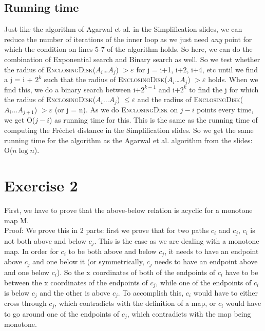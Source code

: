 \documentclass[a4paper,11pt]{article}
\begin{document}
\subsection*{Running time}
Just like the algorithm of Agarwal et al. in the Simplification slides, we can reduce the number of iterations of the inner loop as we just need \textit{any} point for which the condition on lines 5-7 of the algorithm holds. So here, we can do the combination of Exponential search and Binary search as well. So we test whether the radius of \textsc{EnclosingDisk($A_i$\dots $A_j$)} $> \varepsilon$ for j = i+1, i+2, i+4, etc until we find a j = i + $2^k$ such that the radius of \textsc{EnclosingDisk($A_i$\dots $A_j$)} $> \varepsilon$ holds. When we find this, we do a binary search between i+$2^{k-1}$ and i+$2^k$ to find the j for which the radius of \textsc{EnclosingDisk($A_i\dots A_j$)} $\leq \varepsilon$ and the radius of \textsc{EnclosingDisk($A_i\dots A_{j+1}$)} $> \varepsilon$ (or j = n). As we do \textsc{EnclosingDisk} on $j-i$ points every time, we get O($j-i$) as running time for this. This is the same as the running time of computing the Fr\'{e}chet distance in the Simplification slides. So we get the same running time for the algorithm as the Agarwal et al. algorithm from the slides: O($n \log n$).

\section*{Exercise 2}
First, we have to prove that the above-below relation is acyclic for a monotone map M.\\
Proof: We prove this in 2 parts: first we prove that for two paths $c_i$ and $c_j$, $c_i$ is not both above and below $c_j$. This is the case as we are dealing with a monotone map. In order for $c_i$ to be both above and below $c_j$, it needs to have an endpoint above $c_j$ and one below it (or symmetrically, $c_j$ needs to have an endpoint above and one below $c_i$). So the x coordinates of both of the endpoints of $c_i$ have to be between the x coordinates of the endpoints of $c_j$, while one of the endpoints of $c_i$ is below $c_j$ and the other is above $c_j$. To accomplish this, $c_i$ would have to either cross through $c_j$, which contradicts with the definition of a map, or $c_i$ would have to go around one of the endpoints of $c_j$, which contradicts with the map being monotone.\\
\end{document}
